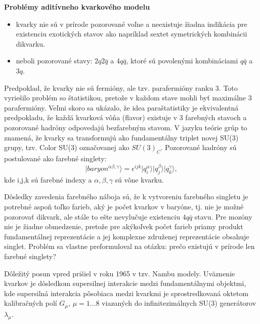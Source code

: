 \documentclass[../../main.tex]{subfiles}
\begin{document}
\textbf{Problémy aditívneho kvarkového modelu}
\begin{itemize}
\item kvarky nie sú v prírode pozorované voľne a neexistuje žiadna indikácia pre existenciu exotických stavov ako napríklad sextet symetrických kombinácii dikvarku.
\item neboli pozorované stavy: $2q2\bar{q}$ a $4q\bar{q}$, ktoré sú povolenými kombináciami $q\bar{q}$ a $3q$. 
\end{itemize}
Predpoklad, že kvarky nie sú fermióny, ale tzv. parafermióny ranku 3. Toto vyriešilo problém so štatistikou, pretože v každom stave mohli byť maximálne 3 parafermióny. Veľmi skoro sa ukázalo, že idea paraštatistiky je ekvivalentná predpokladu, že každá kvarková vôňa (flavor) existuje v 3 farebných stavoch a pozorované hadróny odpovedajú bezfarebným stavom. V jazyku teórie grúp to znamená, že kvarky sa transformujú ako fundamentálny triplet novej SU(3) grupy, tzv. Color SU(3) označovanej ako $SU(3)_C$. Pozorované hadróny sú postulované ako farebné singlety:
$$ \vert baryon^{\alpha \beta, \gamma} \rangle = \epsilon^{ijk} \vert q_i^{\alpha} \rangle \vert q_j^{\beta} \rangle \vert q_k^{\gamma} \rangle,$$
kde i,j,k sú farebné indexy a $\alpha, \beta, \gamma$ sú vône kvarku.

Dôsledky zavedenia farebného náboja sú, že k vytvoreniu farebného singletu je potrebné aspoň toľko farieb, aký je počet kvarkov v baryóne, tj. nie je možné pozorovať dikvark, ale stále to ešte nevylučuje existenciu $4q\bar{q}$ stavu. Pre mozóny nie je žiadne obmedzenie, pretože pre akýkoľvek počet farieb priamy produkt fundamentálnej reprezentácie a jej komplexne združenej reprezentácie obsahuje singlet. Problém sa vlastne preformuloval na otázku: prečo existujú v prírode len farebné singlety? 

Dôležitý posun vpred prišiel v roku 1965 v tzv. Nambu modely. Uväznenie kvarkov je dôsledkom supersilnej interakcie medzi fundamentálnymi objektmi, kde supersilná interakcia pôsobiaca medzi kvarkmi je sprostredkovaná oktetom kalibračných polí $G_{\mu}$, $\mu = 1 ... 8$ viazaných do infinitezimálnych SU(3) generátorov $\lambda_{\mu}$.\newline
\end{document}

